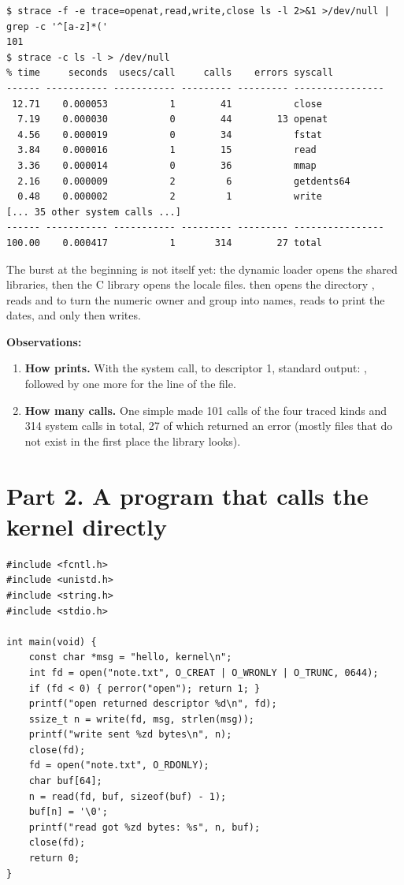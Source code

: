 \documentclass[11pt,a4paper]{article}
\begin{document}
\begin{lstlisting}[caption={Counting the calls of one ls -l}]
$ strace -f -e trace=openat,read,write,close ls -l 2>&1 >/dev/null | grep -c '^[a-z]*('
101
$ strace -c ls -l > /dev/null
% time     seconds  usecs/call     calls    errors syscall
------ ----------- ----------- --------- --------- ----------------
 12.71    0.000053           1        41           close
  7.19    0.000030           0        44        13 openat
  4.56    0.000019           0        34           fstat
  3.84    0.000016           1        15           read
  3.36    0.000014           0        36           mmap
  2.16    0.000009           2         6           getdents64
  0.48    0.000002           2         1           write
[... 35 other system calls ...]
------ ----------- ----------- --------- --------- ----------------
100.00    0.000417           1       314        27 total
\end{lstlisting}

The burst at the beginning is not  itself yet: the dynamic loader opens the shared
libraries, then the C library opens the locale files.  then opens the directory
, reads  and  to turn the numeric owner and group
into names, reads  to print the dates, and only then writes.

\textbf{Observations:}
\begin{enumerate}
  \item \textbf{How  prints.} With the  system call, to descriptor 1,
  standard output: , followed by one more
   for the line of the file.
  \item \textbf{How many calls.} One simple  made 101 calls of the four traced kinds
  and 314 system calls in total, 27 of which returned an error (mostly files that do not exist
  in the first place the library looks).
\end{enumerate}

\section{Part 2. A program that calls the kernel directly}

\begin{lstlisting}[style=ccode,caption={syscalls.c}]
#include <fcntl.h>
#include <unistd.h>
#include <string.h>
#include <stdio.h>

int main(void) {
    const char *msg = "hello, kernel\n";
    int fd = open("note.txt", O_CREAT | O_WRONLY | O_TRUNC, 0644);
    if (fd < 0) { perror("open"); return 1; }
    printf("open returned descriptor %d\n", fd);
    ssize_t n = write(fd, msg, strlen(msg));
    printf("write sent %zd bytes\n", n);
    close(fd);
    fd = open("note.txt", O_RDONLY);
    char buf[64];
    n = read(fd, buf, sizeof(buf) - 1);
    buf[n] = '\0';
    printf("read got %zd bytes: %s", n, buf);
    close(fd);
    return 0;
}
\end{lstlisting}
\end{document}
